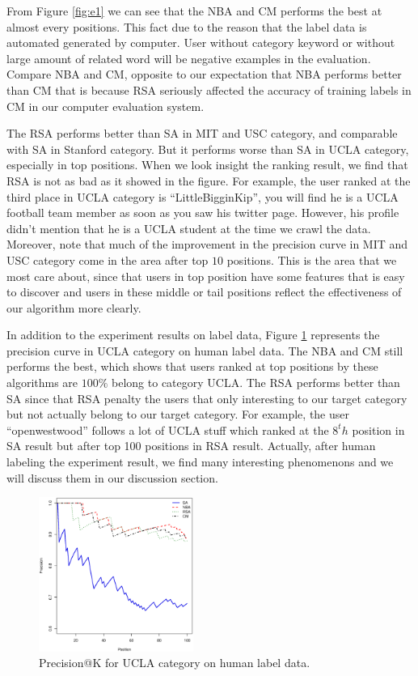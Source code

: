 \documentclass{article}
\begin{document}
From Figure \ref{fig:e1} we can see that the NBA and CM performs the best at almost every positions. This fact due to the reason that the label data is automated generated by computer. User without category keyword or without large amount of related word will be negative examples in the evaluation. Compare NBA and CM, opposite to our expectation that NBA performs better than CM that is because RSA seriously affected the accuracy of training labels in CM in our computer evaluation system.

The RSA performs better than SA in MIT and USC category, and comparable with SA in Stanford category. But it performs worse than SA in UCLA category, especially in top positions. When we look insight the ranking result, we find that RSA is not as bad as it showed in the figure. For example, the user ranked at the third place in UCLA category is ``LittleBigginKip'', you will find he is a UCLA football team member as soon as you saw his twitter page. However, his profile didn't mention that he is a UCLA student at the time we crawl the data. Moreover, note that much of the improvement in the precision curve in MIT and USC category come in the area after top $10$ positions. This is the area that we most care about, since that users in top position have some features that is easy to discover and users in these middle or tail positions reflect the effectiveness of our algorithm more clearly.

In addition to the experiment results on label data, Figure \ref{fig:e2} represents the precision curve in UCLA category on human label data. The NBA and CM still performs the best, which shows that users ranked at top positions by these algorithms are $100\%$ belong to category UCLA. The RSA performs better than SA since that RSA penalty the users that only interesting to our target category but not actually belong to our target category. For example, the user ``openwestwood'' follows a lot of UCLA stuff which ranked at the $8^th$ position in SA result but after top 100 positions in RSA result. Actually, after human labeling the experiment result, we find many interesting phenomenons and we will discuss them in our discussion section.
\begin{figure}[h]
\centering
\includegraphics[width=0.45\textwidth]{experiment/e1.ucla.pool.eps}
\caption{Precision@K for UCLA category on human label data.}
\label{fig:e2}
\end{figure}
\end{document}
